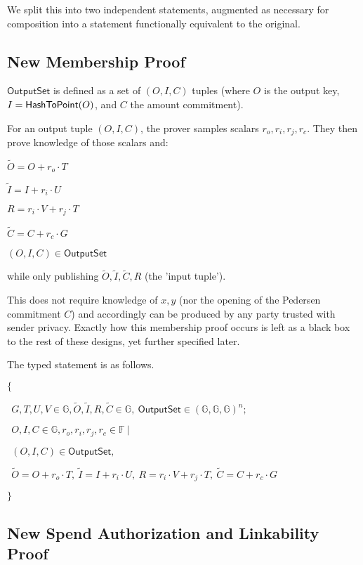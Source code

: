 \documentclass[]{article}
\begin{document}
We split this into two independent statements, augmented as necessary for composition into a statement functionally equivalent to the original.

\newpage

\subsection{New Membership Proof}

$\mathsf{OutputSet}$ is defined as a set of $(O, I, C)$ tuples (where $O$ is the output key, $I = \mathsf{HashToPoint}(O)$, and $C$ the amount commitment). 

For an output tuple $(O, I, C)$, the prover samples scalars $r_o, r_i, r_j, r_c$. They then prove knowledge of those scalars and:

$\tilde{O} = O + r_o \cdot T$

$\tilde{I} = I + r_i \cdot U$

$R = r_i \cdot V + r_j \cdot T$

$\tilde{C} = C + r_c \cdot G$

$(O, I, C) \in \mathsf{OutputSet}$

while only publishing $\tilde{O}, \tilde{I}, \tilde{C}, R$ (the 'input tuple').

This does not require knowledge of $x, y$ (nor the opening of the Pedersen commitment $C$) and accordingly can be produced by any party trusted with sender privacy. Exactly how this membership proof occurs is left as a black box to the rest of these designs, yet further specified later.

The typed statement is as follows.

$\{$

$~~G, T, U, V \in \mathbb{G}, \tilde{O}, \tilde{I}, R, \tilde{C} \in \mathbb{G},~ \mathsf{OutputSet} \in (\mathbb{G}, \mathbb{G}, \mathbb{G})^n;$

$~~O, I, C \in \mathbb{G}, r_o, r_i, r_j, r_c \in \mathbb{F} ~|$

$~~(O, I, C) \in \mathsf{OutputSet},~$

$~~\tilde{O} = O + r_o \cdot T,~ \tilde{I} = I + r_i \cdot U,~ R = r_i \cdot V + r_j \cdot T,~ \tilde{C} = C + r_c \cdot G$

$\}$

\subsection{New Spend Authorization and Linkability Proof}
\end{document}
